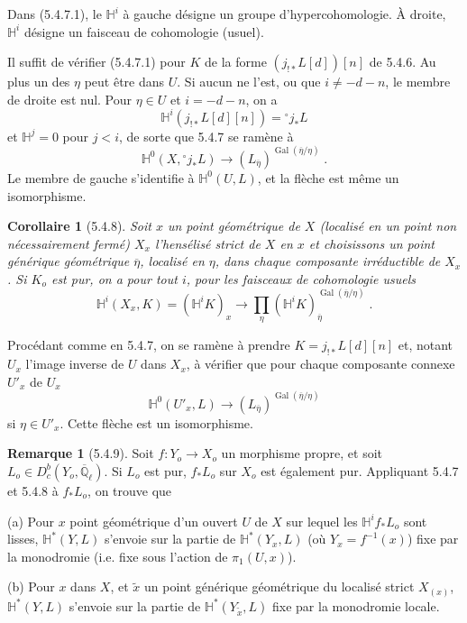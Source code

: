 \documentclass[12pt,a4paper]{article}
\theoremstyle{plain}
\newtheorem{corollary}[theorem]{Corollaire}
\theoremstyle{definition}
\newtheorem{remark}[theorem]{Remarque}
\theoremstyle{remark}
\DeclareMathOperator{\Gal}{Gal}
\newcommand{\HH}{\mathbb{H}}
\newcommand{\QQ}{\mathbb{Q}}
\begin{document}
Dans (5.4.7.1), le $\HH^i$ \`a gauche d\'esigne un groupe d'hypercohomologie. \`A droite, $\HH^i$ d\'esigne un faisceau de cohomologie (usuel).

Il suffit de v\'erifier (5.4.7.1) pour $K$ de la forme $(j_{!*}L[d])[n]$ de 5.4.6. Au plus un des $\eta$ peut \^etre dans $U$. Si aucun ne l'est, ou que $i \neq -d-n$, le membre de droite est nul. Pour $\eta \in U$ et $i = -d-n$, on a
\[
\HH^i(j_{!*}L[d][n]) = {}^{\circ}j_*L
\]
et $\HH^j = 0$ pour $j < i$, de sorte que 5.4.7 se ram\`ene \`a
\[
\HH^0(X, {}^{\circ}j_*L) \longrightarrow (L_{\overline{\eta}})^{\Gal(\overline{\eta}/\eta)}\;.
\]
Le membre de gauche s'identifie \`a $\HH^0(U, L)$, et la fl\`eche est m\^eme un isomorphisme.

\begin{corollary}[5.4.8]
Soit $x$ un point g\'eom\'etrique de $X$ (localis\'e en un point non n\'ecessairement ferm\'e) $X_x$ l'hens\'elis\'e strict de $X$ en $x$ et choisissons un point g\'en\'erique g\'eom\'etrique $\overline{\eta}$, localis\'e en $\eta$, dans chaque composante irr\'eductible de $X_x$. Si $K_o$ est pur, on a pour tout $i$, pour les faisceaux de cohomologie usuels
\[
\HH^i(X_x, K) = (\HH^iK)_x \longrightarrow \prod_{\eta} (\HH^iK)_{\overline{\eta}}^{\Gal(\overline{\eta}/\eta)}\;.
\]
\end{corollary}

Proc\'edant comme en 5.4.7, on se ram\`ene \`a prendre $K = j_{!*}L[d][n]$ et, notant $U_x$ l'image inverse de $U$ dans $X_x$, \`a v\'erifier que pour chaque composante connexe $U'_x$ de $U_x$
\[
\HH^0(U'_x, L) \longrightarrow (L_{\overline{\eta}})^{\Gal(\overline{\eta}/\eta)}
\]
si $\eta \in U'_x$. Cette fl\`eche est un isomorphisme.

\begin{remark}[5.4.9]
Soit $f: Y_o \to X_o$ un morphisme propre, et soit $L_o \in D^b_c(Y_o, \overline{\QQ}_{\ell})$. Si $L_o$ est pur, $f_*L_o$ sur $X_o$ est \'egalement pur. Appliquant 5.4.7 et 5.4.8 \`a $f_*L_o$, on trouve que

(a) Pour $x$ point g\'eom\'etrique d'un ouvert $U$ de $X$ sur lequel les $\HH^if_*L_o$ sont lisses, $\HH^*(Y, L)$ s'envoie sur la partie de $\HH^*(Y_x, L)$ (o\`u $Y_x = f^{-1}(x)$) fixe par la monodromie (i.e. fixe sous l'action de $\pi_1(U, x)$).

(b) Pour $x$ dans $X$, et $\tilde{x}$ un point g\'en\'erique g\'eom\'etrique du localis\'e strict $X_{(x)}$, $\HH^*(Y, L)$ s'envoie sur la partie de $\HH^*(Y_{\tilde{x}}, L)$ fixe par la monodromie locale.
\end{remark}
\end{document}
